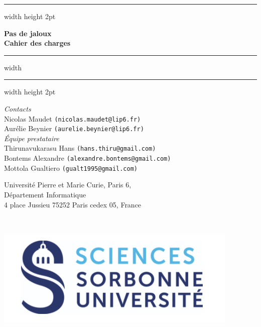 \documentclass[a4paper, 11pt, titlepage, oneside]{report}
\begin{document}
    \begin{titlepage}
    \begin{center}
        \vspace*{2cm}
        \hrule width \hsize height 2pt 
        
        \large{\textbf{Pas de jaloux}}\\[0.35cm]
        \textbf{\LARGE Cahier des charges} \\ [0.7cm]
        
        \hrule width \hsize \kern 1mm \hrule width \hsize height 2pt
        \vspace{0.7cm}
        
        \begin{center}
        		\textit{Contacts}\\[0.5cm]
        		Nicolas Maudet \texttt{(nicolas.maudet@lip6.fr)} \\
			Aurélie Beynier \texttt{(aurelie.beynier@lip6.fr)}\\[1cm]
			
			\textit{Équipe prestataire}\\[0.5cm]
			Thirunavukarasu Hans \texttt{(hans.thiru@gmail.com)}\\
			Bontems Alexandre \texttt{(alexandre.bontems@gmail.com)}\\
			Mottola Gualtiero \texttt{(gualt1995@gmail.com)}

        \end{center}
        \vfill
        \begin{minipage}{0.5\textwidth}
            \small
            Université Pierre et Marie Curie, Paris 6,\\
            Département Informatique \\
            4 place Jussieu 75252 Paris cedex 05, France\\
        \end{minipage}~
        \begin{minipage}{0.5\textwidth}
            \flushright
            \includegraphics[width=0.5\linewidth]{sorbonne.png}
        \end{minipage}
    \end{center}
    \end{titlepage}
\end{document}
